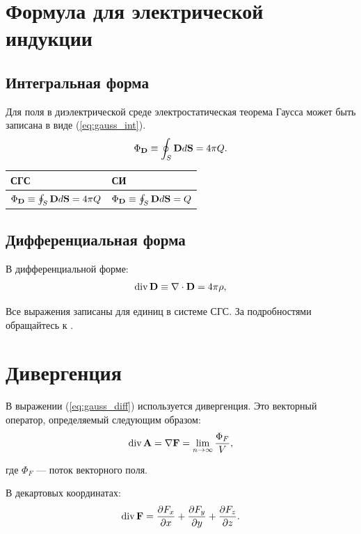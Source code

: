 \documentclass{amcs}
\begin{document}
\section{Формула для электрической индукции}
\subsection{Интегральная форма}
Для поля в диэлектрической среде электростатическая теорема Гаусса может быть записана в виде (\ref{eq:gauss_int}).
\begin{equation} \label{eq:gauss_int}
\Phi_{\boldsymbol{\mathbf{D}}}\equiv\oint_S\boldsymbol{\mathbf{D}}d\boldsymbol{\mathbf{S}}=4\pi Q.
\end{equation}
\begin{center}
\begin{tabular}[t]{|p{16em}|p{16em}|}
\hline
СГС & СИ \\
\hline
\(\Phi_{\boldsymbol{\mathbf{D}}}\equiv\oint_S\boldsymbol{\mathbf{D}}d\boldsymbol{\mathbf{S}}=4\pi Q\) & \(\Phi_{\boldsymbol{\mathbf{D}}}\equiv\oint_S\boldsymbol{\mathbf{D}}d\boldsymbol{\mathbf{S}}=Q\) \\
\hline
\end{tabular}
\end{center}

\subsection{Дифференциальная форма}
В дифференциальной форме:
\begin{equation} \label{eq:gauss_diff}
\operatorname{div}\boldsymbol{\mathbf{D}}\equiv\nabla\cdot\boldsymbol{\mathbf{D}}=4\pi\rho,
\end{equation}

Все выражения записаны для единиц в системе СГС. За подробностями обращайтесь к \cite{b0}.

\section{Дивергенция}
В выражении (\ref{eq:gauss_diff}) используется дивергенция. Это векторный оператор, определяемый следующим образом:
\begin{equation} \label{eq:div_vec}
\operatorname{div}\boldsymbol{\mathbf{A}}=\nabla\boldsymbol{\mathbf{F}}=\lim_{n \to \infty}\frac{\Phi_F}{V},
\end{equation}

где $\Phi_F$ --- поток векторного поля.

В декартовых координатах:
\begin{equation} \label{eq:div_dec}
\operatorname{div}\boldsymbol{\mathbf{F}}=\frac{\partial F_x}{\partial x}+\frac{\partial F_y}{\partial y}+\frac{\partial F_z}{\partial z}.
\end{equation}
\end{document}
